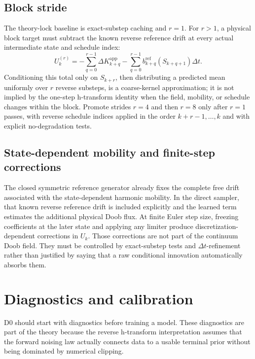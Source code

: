 \documentclass[11pt]{article}
\numberwithin{equation}{section}
\newcommand{\1}{\mathbf 1}
\begin{document}
\subsection{Block stride}

The theory-lock baseline is exact-substep caching and \(r=1\).  For \(r>1\), a physical block target must subtract the known reverse reference drift at every actual intermediate state and schedule index:
\begin{equation}\label{eq:block-physical-residual-d0}
  U_k^{(r)}=-\sum_{q=0}^{r-1}\Delta K_{k+q}^{\mathrm{app}}
  -\sum_{q=0}^{r-1}b_{k+q}^{\mathrm{ref}}(S_{k+q+1})\Delta t.
\end{equation}
Conditioning this total only on \(S_{k+r}\), then distributing a predicted mean uniformly over \(r\) reverse substeps, is a coarse-kernel approximation; it is not implied by the one-step h-transform identity when the field, mobility, or schedule changes within the block.  Promote strides \(r=4\) and then \(r=8\) only after \(r=1\) passes, with reverse schedule indices applied in the order \(k+r-1,\ldots,k\) and with explicit no-degradation tests.

\subsection{State-dependent mobility and finite-step corrections}

The closed symmetric reference generator already fixes the complete free drift associated with the state-dependent harmonic mobility.  In the direct sampler, that known reverse reference drift is included explicitly and the learned term estimates the additional physical Doob flux.  At finite Euler step size, freezing coefficients at the later state and applying any limiter produce discretization-dependent corrections in \(U_k\).  Those corrections are not part of the continuum Doob field.  They must be controlled by exact-substep tests and \(\Delta t\)-refinement rather than justified by saying that a raw conditional innovation automatically absorbs them.

\section{Diagnostics and calibration}

D0 should start with diagnostics before training a model.  These diagnostics are part of the theory because the reverse h-transform interpretation assumes that the forward noising law actually connects data to a usable terminal prior without being dominated by numerical clipping.
\end{document}

